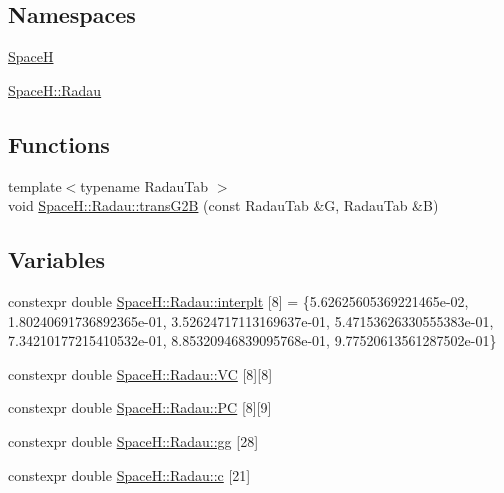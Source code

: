 \subsection*{Namespaces}
\begin{DoxyCompactItemize}
\item 
 \mbox{\hyperlink{namespace_space_h}{SpaceH}}
\item 
 \mbox{\hyperlink{namespace_space_h_1_1_radau}{Space\+H\+::\+Radau}}
\end{DoxyCompactItemize}
\subsection*{Functions}
\begin{DoxyCompactItemize}
\item 
{\footnotesize template$<$typename Radau\+Tab $>$ }\\void \mbox{\hyperlink{namespace_space_h_1_1_radau_ac20bc7d0c1a878276e64f05506b875e5}{Space\+H\+::\+Radau\+::trans\+G2B}} (const Radau\+Tab \&G, Radau\+Tab \&B)
\end{DoxyCompactItemize}
\subsection*{Variables}
\begin{DoxyCompactItemize}
\item 
constexpr double \mbox{\hyperlink{namespace_space_h_1_1_radau_ace842233b380d237a5275cf16462ceeb}{Space\+H\+::\+Radau\+::interplt}} \mbox{[}8\mbox{]} = \{5.\+62625605369221465e-\/02, 1.\+80240691736892365e-\/01, 3.\+52624717113169637e-\/01, 5.\+47153626330555383e-\/01, 7.\+34210177215410532e-\/01, 8.\+85320946839095768e-\/01, 9.\+77520613561287502e-\/01\}
\item 
constexpr double \mbox{\hyperlink{namespace_space_h_1_1_radau_a9fb1c247de193221b47ce294964aa06b}{Space\+H\+::\+Radau\+::\+VC}} \mbox{[}8\mbox{]}\mbox{[}8\mbox{]}
\item 
constexpr double \mbox{\hyperlink{namespace_space_h_1_1_radau_a24cc5eaca3250fc45186dd96873afe73}{Space\+H\+::\+Radau\+::\+PC}} \mbox{[}8\mbox{]}\mbox{[}9\mbox{]}
\item 
constexpr double \mbox{\hyperlink{namespace_space_h_1_1_radau_a4b01e8b6450f665f02918969259eea09}{Space\+H\+::\+Radau\+::gg}} \mbox{[}28\mbox{]}
\item 
constexpr double \mbox{\hyperlink{namespace_space_h_1_1_radau_a8ef5a0de3fa20bfed420d08e5b85dcd9}{Space\+H\+::\+Radau\+::c}} \mbox{[}21\mbox{]}
\end{DoxyCompactItemize}
